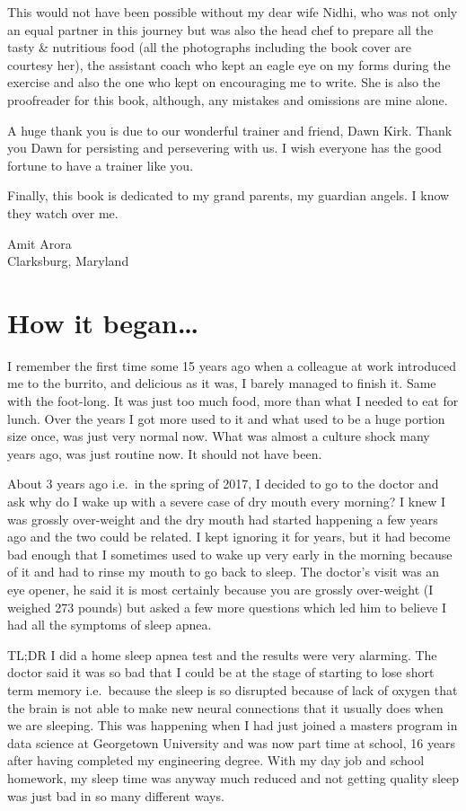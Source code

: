 \documentclass[
  oneside]{book}
\begin{document}
This would not have been possible without my dear wife Nidhi, who was not only an equal partner in this journey but was also the head chef to prepare all the tasty \& nutritious food (all the photographs including the book cover are courtesy her), the assistant coach who kept an eagle eye on my forms during the exercise and also the one who kept on encouraging me to write. She is also the proofreader for this book, although, any mistakes and omissions are mine alone.

A huge thank you is due to our wonderful trainer and friend, Dawn Kirk. Thank you Dawn for persisting and persevering with us. I wish everyone has the good fortune to have a trainer like you.

Finally, this book is dedicated to my grand parents, my guardian angels. I know they watch over me.

Amit Arora\\
Clarksburg, Maryland

\hypertarget{how-it-began}{%
\chapter{How it began\ldots{}}\label{how-it-began}}

I remember the first time some 15 years ago when a colleague at work introduced me to the burrito, and delicious as it was, I barely managed to finish it. Same with the foot-long. It was just too much food, more than what I needed to eat for lunch. Over the years I got more used to it and what used to be a huge portion size once, was just very normal now. What was almost a culture shock many years ago, was just routine now. It should not have been.

About 3 years ago i.e.~in the spring of 2017, I decided to go to the doctor and ask why do I wake up with a severe case of dry mouth every morning? I knew I was grossly over-weight and the dry mouth had started happening a few years ago and the two could be related. I kept ignoring it for years, but it had become bad enough that I sometimes used to wake up very early in the morning because of it and had to rinse my mouth to go back to sleep. The doctor's visit was an eye opener, he said it is most certainly because you are grossly over-weight (I weighed 273 pounds) but asked a few more questions which led him to believe I had all the symptoms of sleep apnea.

TL;DR I did a home sleep apnea test and the results were very alarming. The doctor said it was so bad that I could be at the stage of starting to lose short term memory i.e.~because the sleep is so disrupted because of lack of oxygen that the brain is not able to make new neural connections that it usually does when we are sleeping. This was happening when I had just joined a masters program in data science at Georgetown University and was now part time at school, 16 years after having completed my engineering degree. With my day job and school homework, my sleep time was anyway much reduced and not getting quality sleep was just bad in so many different ways.
\end{document}
